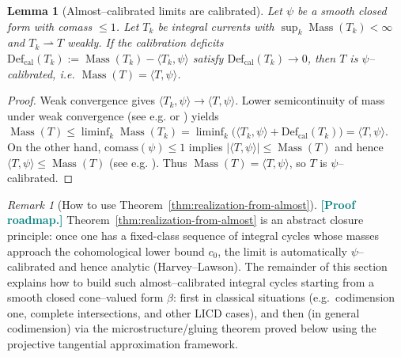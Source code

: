 \documentclass[11pt]{article}
\newcommand{\REVMZ}[1]{\textcolor{teal}{#1}}  %
\numberwithin{equation}{section}  %
\theoremstyle{plain}
\newtheorem{lemma}[theorem]{Lemma}
\theoremstyle{definition}
\theoremstyle{remark}
\newtheorem{remark}[theorem]{Remark}
\DeclareMathOperator{\Mass}{Mass}
\newcommand{\Def}{\mathrm{Def}}
\begin{document}
\begin{lemma}[Almost--calibrated limits are calibrated]\label{lem:limit_is_calibrated}
Let $\psi$ be a smooth closed form with comass $\le 1$.
Let $T_k$ be integral currents with $\sup_k\Mass(T_k)<\infty$ and $T_k\rightharpoonup T$ weakly.
If the calibration deficits $\Def_{\mathrm{cal}}(T_k):=\Mass(T_k)-\langle T_k,\psi\rangle$ satisfy $\Def_{\mathrm{cal}}(T_k)\to 0$,
then $T$ is $\psi$--calibrated, i.e. $\Mass(T)=\langle T,\psi\rangle$.
\end{lemma}

\begin{proof}
Weak convergence gives $\langle T_k,\psi\rangle\to \langle T,\psi\rangle$.
Lower semicontinuity of mass under weak convergence (see e.g. \cite[Ch.~XIV]{LangGmT} or \cite{Sim83}) yields
$\Mass(T)\le \liminf_k \Mass(T_k)=\liminf_k\bigl(\langle T_k,\psi\rangle+\Def_{\mathrm{cal}}(T_k)\bigr)
=\langle T,\psi\rangle$.
On the other hand, $\mathrm{comass}(\psi)\le 1$ implies $|\langle T,\psi\rangle|\le \Mass(T)$ and hence $\langle T,\psi\rangle\le \Mass(T)$ (see e.g. \cite[Lemma~3.5]{HL82}).
Thus $\Mass(T)=\langle T,\psi\rangle$, so $T$ is $\psi$--calibrated.
\end{proof}





\begin{remark}[How to use Theorem~\ref{thm:realization-from-almost}]
\label{rem:cone-closed-what-used}
\REVMZ{\textbf{[Proof roadmap.]}}
	Theorem~\ref{thm:realization-from-almost} is an abstract closure principle: once one has a fixed-class sequence of integral cycles whose masses approach the cohomological lower bound $c_0$,
	the limit is automatically $\psi$--calibrated and hence analytic (Harvey--Lawson).
	The remainder of this section explains how to build such almost--calibrated integral cycles starting from a smooth closed cone--valued form $\beta$:
	first in classical situations (e.g.\ codimension one, complete intersections, and other LICD cases), and then (in general codimension) via the microstructure/gluing theorem proved below using the projective tangential approximation framework.
	
\end{remark}
\end{document}
